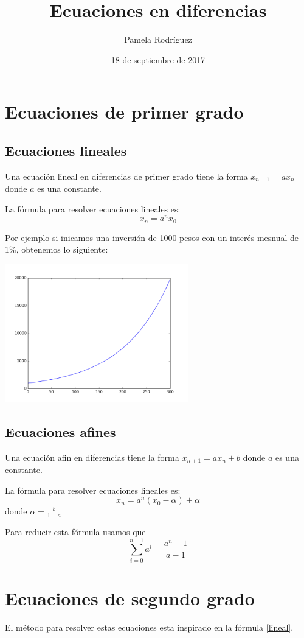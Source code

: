 \documentclass{article}
\title{Ecuaciones en diferencias}
\author{Pamela Rodríguez}
\date{18 de septiembre de 2017}
\begin{document}
\maketitle

\section{Ecuaciones de primer grado}

\subsection{Ecuaciones lineales}

Una ecuación lineal en diferencias de primer grado tiene la forma $x_{n+1}=ax_{n}$ donde $a$ es una constante.

La fórmula para resolver ecuaciones lineales es:
\begin{equation}
  \label{lineal}
x_n=a^nx_0  
\end{equation}

Por ejemplo si inicamos una inversión de 1000 pesos con un interés mesnual de 1\%, obtenemos lo siguiente:

\begin{center}
  \includegraphics[width=8cm]{inversion.png}
\end{center}


\subsection{Ecuaciones afines}

Una ecuación afin en diferencias tiene la forma $x_{n+1}=ax_{n}+b$ donde $a$ es una constante.

La fórmula para resolver ecuaciones lineales es:
\begin{equation}
  \label{afin}
  x_n=a^n(x_0-\alpha)+\alpha
\end{equation}
donde $\alpha=\frac{b}{1-a}$ 

Para reducir esta fórmula usamos que $$\sum_{i=0}^{n-1}a^i=\frac{a^n-1}{a-1}$$
\section{Ecuaciones de segundo grado}
El método para resolver estas ecuaciones esta inspirado en la fórmula \ref{lineal}.
\end{document}
